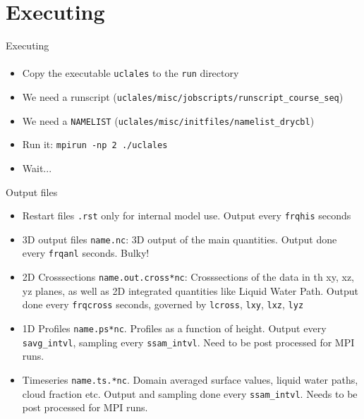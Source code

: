 \documentclass[handout]{beamer}
\newcommand{\code}[1]{{\tt #1}}
\begin{document}
\section{Executing}
\begin{frame}[<+->]{Executing}
\framesubtitle{}
\begin{itemize}
 \item Copy the executable \code{uclales} to the \code{run} directory
 \item We need a runscript (\code{uclales/misc/jobscripts/runscript\_course\_seq})
 \item We need a \code{NAMELIST} (\code{uclales/misc/initfiles/namelist\_drycbl})
 \item Run it: \code{mpirun -np 2 ./uclales}
 \item Wait...
\end{itemize}

\end{frame}
 \begin{frame}[allowframebreaks]{Output files}
 \begin{itemize}
  \item Restart files \code{*.rst} only for internal model use. Output every \code{frqhis} seconds
  \item 3D output files \code{name.nc}: 3D output of the main quantities. Output done every \code{frqanl} seconds. Bulky!
  \item 2D Crosssections \code{name.out.cross*nc}: Crosssections of the data in th xy, xz, yz planes, as well as 2D integrated quantities like Liquid Water Path. Output done every \code{frqcross} seconds, governed by \code{lcross}, \code{lxy}, \code{lxz}, \code{lyz}
  \item 1D Profiles \code{name.ps*nc}. Profiles as a function of height. Output every \code{savg\_intvl}, sampling every \code{ssam\_intvl}. Need to be post processed for MPI runs.
  \item Timeseries \code{name.ts.*nc}. Domain averaged surface values, liquid water paths, cloud fraction etc. Output and sampling done every \code{ssam\_intvl}. Needs to be post processed for MPI runs.
 \end{itemize}
\end{frame}
\end{document}
